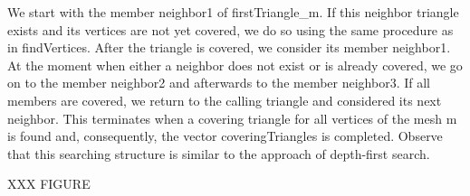 \documentclass[10pt]{article}
\begin{document}
We start with the member {\ttfamily neighbor1} of {\ttfamily firstTriangle\_m}. If this neighbor triangle exists and its vertices are not yet covered, we do so using the same procedure as in {\ttfamily findVertices}. After the triangle is covered, we consider its member {\ttfamily neighbor1}. At the moment when either a neighbor does not exist or is already covered, we go on to the member {\ttfamily neighbor2} and afterwards to the member {\ttfamily neighbor3}. If all members are covered, we return to the calling triangle and considered its next neighbor. This terminates when a covering triangle for all vertices of the mesh {\ttfamily m} is found and, consequently, the vector {\ttfamily coveringTriangles} is completed. Observe that this searching structure is similar to the approach of depth-first search.

XXX FIGURE
\end{document}
